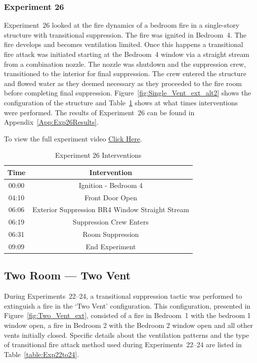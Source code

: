 \documentclass[12pt,oneside]{book}
\begin{document}
\subsubsection{Experiment 26}
Experiment~26 looked at the fire dynamics of a bedroom fire in a single-story structure with transitional suppression. The fire was ignited in Bedroom~4. The fire develops and becomes ventilation limited. Once this happens a transitional fire attack was initiated starting at the Bedroom~4 window via a straight stream from a combination nozzle. The nozzle was shutdown and the suppression crew, transitioned to the interior for final suppression. The crew entered the structure and flowed water as they deemed necessary as they proceeded to the fire room before completing final suppression.  Figure~\ref{fig:Single_Vent_ext_alt2} shows the configuration of the structure and Table~\ref{Table:Exp26Interventions} shows at what times interventions were performed. The results of Experiment~26 can be found in Appendix~\ref{App:Exp26Results}. 

To view the full experiment video \href{https://player.vimeo.com/video/170499626?autoplay=1}{Click Here}.

\begin{table}[H]
	\centering
	\caption{Experiment 26 Interventions}
	\begin{tabular}{|c|c|} 
		\hline
		Time & Intervention \\ \hline \hline
		00:00 & Ignition - Bedroom 4 \\ \hline
		04:10 & Front Door Open \\ \hline
		06:06 & Exterior Suppression BR4 Window Straight Stream \\ \hline
		06:19 & Suppression Crew Enters\\ \hline
		06:31 & Room Suppression \\ \hline 
		09:09 & End Experiment\\ \hline
	\end{tabular}
	\label{Table:Exp26Interventions}
\end{table}

\clearpage

\subsection{Two Room --- Two Vent}
During Experiments~22--24, a transitional suppression tactic was performed to extinguish a fire in the `Two Vent' configuration. This configuration, presented in Figure~\ref{fig:Two_Vent_ext}, consisted of a fire in Bedroom~1 with the bedroom 1 window open, a fire in Bedroom 2 with the Bedroom 2 window open and all other vents initially closed. Specific details about the ventilation patterns and the type of transitional fire attack method used during Experiments~22--24 are listed in Table~\ref{table:Exp22to24}. 
\end{document}
